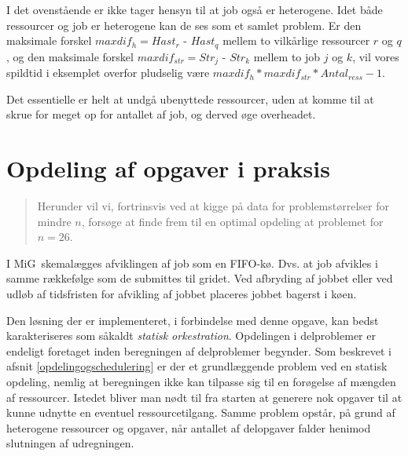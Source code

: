 \documentclass[pdf,draft,a4paper,11pt]{article}
\newcommand{\mig}{MiG}
\begin{document}
I det ovenstående er ikke tager hensyn til at job også er heterogene. Idet både ressourcer og job er heterogene kan de ses som et samlet problem. Er den maksimale forskel $maxdif_{h} = Hast_{r}$ - $Hast_{q}$ mellem to vilkårlige ressourcer $r$ og $q$, og den maksimale forskel $maxdif_{str} = Str_{j}$ - $Str_{k}$ mellem to job $j$ og $k$, vil vores spildtid i eksemplet overfor pludselig være $maxdif_{h} * maxdif_{str} * Antal_{ress} - 1$.

Det essentielle er helt at undgå ubenyttede ressourcer, uden at komme til at skrue for meget op for antallet af job, og derved øge overheadet.



\section{Opdeling af opgaver i praksis}\label{opdelingipraksis}
\begin{verse}
	Herunder vil vi, fortrinsvis ved at kigge på data for problemstørrelser for mindre $n$, forsøge at finde frem til en optimal opdeling at problemet for $n=26$.
\end{verse}

I \mig\ skemalægges afviklingen af job som en FIFO-kø. Dvs. at job afvikles i samme rækkefølge som de submittes til gridet. Ved afbryding af jobbet eller ved udløb af tidsfristen for afvikling af jobbet placeres jobbet bagerst i køen. 

Den løsning der er implementeret, i forbindelse med denne opgave, kan bedst karakteriseres som såkaldt \emph{statisk orkestration}. Opdelingen i delproblemer er endeligt foretaget inden beregningen af delproblemer begynder. Som beskrevet i afsnit \ref{opdelingogschedulering} er der et grundlæggende problem ved en statisk opdeling, nemlig at beregningen ikke kan tilpasse sig til en forøgelse af mængden af ressourcer. Istedet bliver man nødt til fra starten at generere nok opgaver til at kunne udnytte en eventuel ressourcetilgang. Samme problem opstår, på grund af heterogene ressourcer og opgaver, når antallet af delopgaver falder henimod slutningen af udregningen. 
\end{document}
